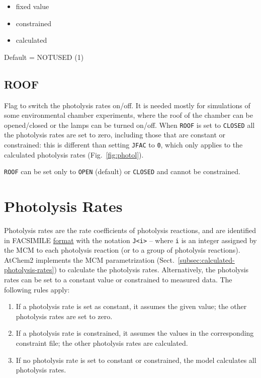 \begin{itemize}
\item fixed value
\item constrained
\item calculated
\end{itemize}

Default = NOTUSED (1)

\subsection{ROOF} \label{subsec:roof}

Flag to switch the photolysis rates on/off. It is needed mostly for
simulations of some environmental chamber experiments, where the roof
of the chamber can be opened/closed or the lamps can be turned on/off.
When \texttt{ROOF} is set to \texttt{CLOSED} all the photolysis rates
are set to zero, including those that are constant or constrained:
this is different than setting \texttt{JFAC} to \texttt{0}, which only
applies to the calculated photolysis rates (Fig.~\ref{fig:photol}).

\texttt{ROOF} can be set only to \texttt{OPEN} (default) or
\texttt{CLOSED} and cannot be constrained.

\section{Photolysis Rates} \label{sec:photolysis-rates}

Photolysis rates are the rate coefficients of photolysis reactions,
and are identified in FACSIMILE \hyperref[subsec:facsimile-format]{format}
with the notation \verb|J<i>| -- where \texttt{i} is an integer
assigned by the MCM to each photolysis reaction (or to a group of
photolysis reactions). AtChem2 implements the MCM parametrization
(Sect.~\ref{subsec:calculated-photolysis-rates}) to calculate the
photolysis rates. Alternatively, the photolysis rates can be set to a
constant value or constrained to measured data. The following rules
apply:

\begin{enumerate}
\item If a photolysis rate is set as constant, it assumes the given
  value; the other photolysis rates are set to zero.
\item If a photolysis rate is constrained, it assumes the values in
  the corresponding constraint file; the other photolysis rates are
  calculated.
\item If no photolysis rate is set to constant or constrained, the
  model calculates all photolysis rates.
\end{enumerate}

